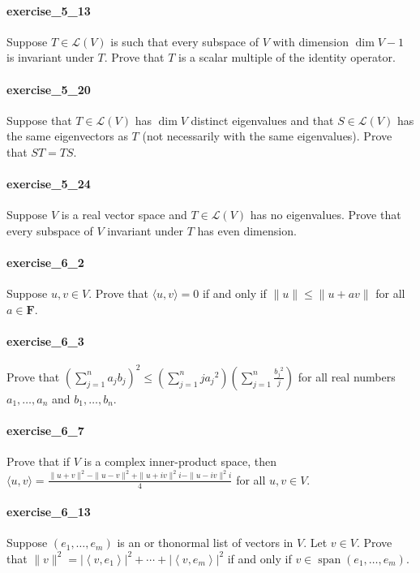 \documentclass{article}
\begin{document}
\paragraph{exercise\_5\_13} Suppose $T \in \mathcal{L}(V)$ is such that every subspace of $V$ with dimension $\operatorname{dim} V-1$ is invariant under $T$. Prove that $T$ is a scalar multiple of the identity operator.

\paragraph{exercise\_5\_20} Suppose that $T \in \mathcal{L}(V)$ has $\operatorname{dim} V$ distinct eigenvalues and that $S \in \mathcal{L}(V)$ has the same eigenvectors as $T$ (not necessarily with the same eigenvalues). Prove that $S T=T S$.

\paragraph{exercise\_5\_24} Suppose $V$ is a real vector space and $T \in \mathcal{L}(V)$ has no eigenvalues. Prove that every subspace of $V$ invariant under $T$ has even dimension.

\paragraph{exercise\_6\_2} Suppose $u, v \in V$. Prove that $\langle u, v\rangle=0$ if and only if $\|u\| \leq\|u+a v\|$ for all $a \in \mathbf{F}$.

\paragraph{exercise\_6\_3} Prove that $\left(\sum_{j=1}^{n} a_{j} b_{j}\right)^{2} \leq\left(\sum_{j=1}^{n} j a_{j}{ }^{2}\right)\left(\sum_{j=1}^{n} \frac{b_{j}{ }^{2}}{j}\right)$ for all real numbers $a_{1}, \ldots, a_{n}$ and $b_{1}, \ldots, b_{n}$.

\paragraph{exercise\_6\_7} Prove that if $V$ is a complex inner-product space, then $\langle u, v\rangle=\frac{\|u+v\|^{2}-\|u-v\|^{2}+\|u+i v\|^{2} i-\|u-i v\|^{2} i}{4}$ for all $u, v \in V$.

\paragraph{exercise\_6\_13} Suppose $\left(e_{1}, \ldots, e_{m}\right)$ is an or thonormal list of vectors in $V$. Let $v \in V$. Prove that $\|v\|^{2}=\left|\left\langle v, e_{1}\right\rangle\right|^{2}+\cdots+\left|\left\langle v, e_{m}\right\rangle\right|^{2}$ if and only if $v \in \operatorname{span}\left(e_{1}, \ldots, e_{m}\right)$.
\end{document}
